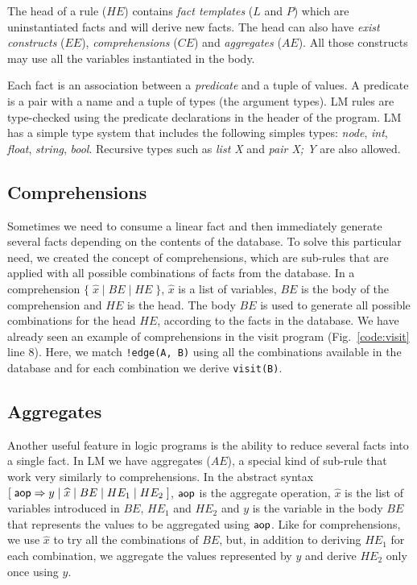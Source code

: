The head of a rule ($HE$) contains \emph{fact templates} ($L$ and $P$) which are uninstantiated facts and will derive new facts. The head can also have \emph{exist constructs} ($EE$), \emph{comprehensions} ($CE$) and \emph{aggregates} ($AE$). All those constructs
may use all the variables instantiated in the body.

Each fact is an association between a \emph{predicate} and a tuple of values. A predicate is a pair with a name and a tuple of types (the argument types). LM rules are type-checked using the predicate declarations in the header of the program. LM has a simple type system that includes the following simples types: \emph{node}, \emph{int}, \emph{float}, \emph{string}, \emph{bool}. Recursive types such as \emph{list X} and \emph{pair X; Y} are
also allowed.

\subsection{Comprehensions}

Sometimes we need to consume a linear fact and then immediately generate several facts depending on
the contents of the database. To solve this particular need, we created the concept of comprehensions, which are
sub-rules that are applied with all possible combinations of facts from the database. In a comprehension $\{ \; \widehat{x} \; | \; BE \; | \; HE \; \}$, $\widehat{x}$ is a list of variables, $BE$ is the body of the comprehension and $HE$ is the head.
The body $BE$ is used to generate all possible combinations for the head $HE$, according to the facts
in the database.  We have already seen an example of comprehensions in the visit program (Fig.~\ref{code:visit} line 8).
Here, we match \texttt{!edge(A, B)} using all the combinations available in the database and for each combination we derive \texttt{visit(B)}.

\subsection{Aggregates}

Another useful feature in logic programs is the ability to reduce several facts into a single fact.
In LM we have aggregates ($AE$), a special kind of sub-rule that work very similarly to comprehensions.
In the abstract syntax $[\;\mathsf{aop} \Rightarrow y \; | \; \widehat{x} \; | \; BE \; | \; HE_1 \; |
\; HE_2 \;]$, $\mathsf{aop}$ is the aggregate operation, $\widehat{x}$ is the list of variables
introduced in $BE$, $HE_1$ and $HE_2$ and $y$ is the variable in the body
$BE$ that represents the values to be aggregated using $\mathsf{aop}$. Like for comprehensions,
we use $\widehat{x}$ to try all the combinations of $BE$, but, in addition to deriving $HE_1$ for each combination,
we aggregate the values represented by $y$ and derive $HE_2$ only once using $y$.

